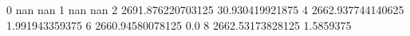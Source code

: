 0 nan nan
1 nan nan
2 2691.876220703125 30.930419921875
4 2662.937744140625 1.991943359375
6 2660.94580078125 0.0
8 2662.53173828125 1.5859375
